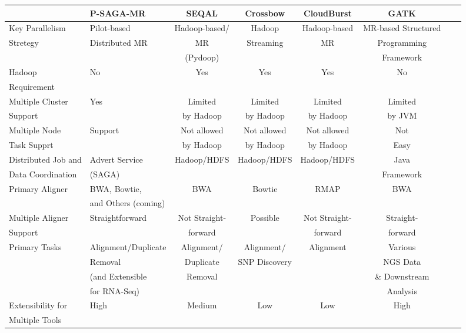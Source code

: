 \documentclass{sig-alternate}
\begin{document}
\begin{center}
\begin{table}[ht]
{\small
\hfill{}
\begin{tabular}{|l|l|c|c|c|c|c|c|}
\hline
  & \textbf{P-SAGA-MR}\cite{pmr2012} & \textbf{SEQAL}\cite{seal2011} & \textbf{Crossbow}\cite{langmead2009} & \textbf{CloudBurst}\cite{cloudburst} & \textbf{GATK}\cite{gatk} \\ \hline
 \hline 
Key Parallelism   & Pilot-based   &  Hadoop-based/  &  Hadoop   & Hadoop-based & MR-based Structured \\ 
Stretegy  & Distributed MR & MR  & Streaming  & MR & Programming  \\
& & (Pydoop) &  & & Framework  \\ \hline
  
Hadoop & No & Yes & Yes\footnote[1] & Yes & No \\ 
Requirement  & & & &  &\\ \hline  
    
Multiple  Cluster & Yes  & Limited   & Limited  & Limited  & Limited \\
Support &  & by Hadoop &  by Hadoop & by Hadoop  & by JVM   \\ \hline

Multiple Node & Support & Not allowed  & Not allowed  & Not allowed & Not  \\
Task Supprt &  & by Hadoop & by Hadoop & by Hadoop & Easy  \\ \hline
Distributed Job and  & Advert Service  & Hadoop/HDFS & Hadoop/HDFS & Hadoop/HDFS & Java \\ 
Data Coordination &(SAGA) &  & & & Framework\\ \hline


Primary Aligner &  BWA, Bowtie,  &  BWA & Bowtie & RMAP &  BWA \\
& and Others (coming) &  &  &  &  \\ \hline
Multiple Aligner  & Straightforward & Not Straight- & Possible & Not Straight-  & Straight-  \\ 
Support &  & forward &   & forward  & forward \\\hline
Primary Tasks & Alignment/Duplicate  & Alignment/ & Alignment/ & Alignment &Various\\
  &  Removal & Duplicate & SNP Discovery & & NGS Data  \\  
           & (and Extensible &  Removal & &  & \& Downstream  \\
           & for RNA-Seq) & & &  & Analysis \\ \hline  
Extensibility for   &  High  & Medium &  Low & Low & High      \\
Multiple Tools  &      &  &  &  &   \\ \hline


\end{tabular}}
\end{table}
\end{center}
\end{document}
